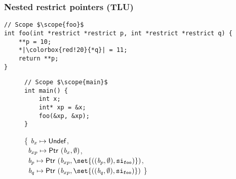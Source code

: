 \begin{frame}[fragile]
\frametitle{Nested restrict pointers (TLU)}
\begin{verbatim}
// Scope $\scope{foo}$
int foo(int *restrict *restrict p, int *restrict *restrict q) {
    **p = 10;
    *|\colorbox{red!20}{*q}| = 11;
    return **p;
}
\end{verbatim}

\vspace*{-2cm}

\begin{figure}[!h]
\begin{minipage}[t]{.3\textwidth}
\begin{verbatim}
// Scope $\scope{main}$
int main() {
    int x;
    int* xp = &x;
    foo(&xp, &xp);
}
\end{verbatim}
\end{minipage}%
\begin{minipage}{.7\textwidth}

\executionannotation
{
\{ $\textit{b}_x \mapsto \mathsf{Undef}$, \\
    \ $\textit{b}_{xp} \mapsto \mathsf{Ptr} \ (\textit{b}_x, \emptyset)$, \\
    \ $\Blockvar_p \mapsto \ptr{(\Blockvar_{xp}, \set{((\Blockvar_p, \emptyset), \scope{foo})})}$, \\
    \ $\Blockvar_q \mapsto \ptr{(\Blockvar_{xp}, \set{((\Blockvar_q, \emptyset), \scope{foo})})}$ \}
}
{
}

\end{minipage}
\end{figure}

\end{frame}



